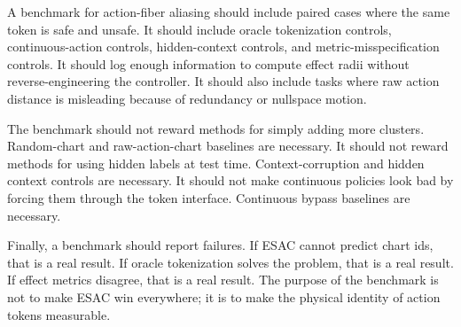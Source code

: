 \documentclass{article}
\begin{document}
A benchmark for action-fiber aliasing should include paired cases where the
same token is safe and unsafe. It should include oracle tokenization controls,
continuous-action controls, hidden-context controls, and metric-misspecification
controls. It should log enough information to compute effect radii without
reverse-engineering the controller. It should also include tasks where raw
action distance is misleading because of redundancy or nullspace motion.

The benchmark should not reward methods for simply adding more clusters.
Random-chart and raw-action-chart baselines are necessary. It should not reward
methods for using hidden labels at test time. Context-corruption and hidden
context controls are necessary. It should not make continuous policies look bad
by forcing them through the token interface. Continuous bypass baselines are
necessary.

Finally, a benchmark should report failures. If ESAC cannot predict chart ids,
that is a real result. If oracle tokenization solves the problem, that is a real
result. If effect metrics disagree, that is a real result. The purpose of the
benchmark is not to make ESAC win everywhere; it is to make the physical
identity of action tokens measurable.
\end{document}
